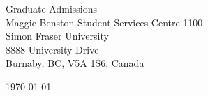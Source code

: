 \begin{minipage}{0.49\textwidth}
\begin{flushleft}
\noindent
Graduate Admissions \\
Maggie Benston Student Services Centre 1100 \\
Simon Fraser University \\
8888 University Drive \\
Burnaby, BC, V5A 1S6, Canada
\end{flushleft}
\end{minipage}
\begin{minipage}{0.47\textwidth}
\begin{flushright}
\today
\end{flushright}
\end{minipage} \\

\newcommand{\univ}{Simon Fraser University}
\newcommand{\univshort}{SFU}
\newcommand{\degree}{M.Sc.}
\newcommand{\dept}{Computer Science}
